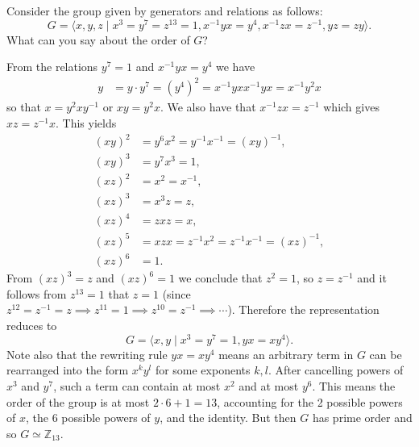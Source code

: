 \documentclass{article}
\newcounter{Problem}
\newenvironment{Problem}{\begin{Exercise}[name={Problem},
                                          counter={Problem}]}
                        {\end{Exercise}}
\begin{document}
\pagebreak

\begin{Problem}
Consider the group given by generators and relations as follows:
$$
G = \langle
      x, y, z
    \mid
      x^3 = y^7 = z^{13} = 1,
      x^{-1} y x = y^4,
      x^{-1} z x = z^{-1},
      yz = zy
    \rangle.
$$
What can you say about the order of $G$?
\end{Problem}

\begin{Answer}
From the relations $y^7 = 1$ and $x^{-1} y x = y^4$ we have
\begin{align*}
   y
&= y \cdot y^7
 = (y^4)^2
 = x^{-1} y x x^{-1} y x
 = x^{-1} y^2 x
\end{align*}
so that $x = y^2 x y^{-1}$ or $xy = y^2 x$.
We also have that $x^{-1}zx = z^{-1}$ which gives
$xz = z^{-1}x$. This yields
\begin{align*}
(xy)^2 &= y^6 x^2 = y^{-1} x^{-1} = (xy)^{-1}, \\
(xy)^3 &= y^7 x^3 = 1, \\
(xz)^2 &= x^2 = x^{-1}, \\
(xz)^3 &= x^3z = z, \\
(xz)^4 &= zxz = x, \\
(xz)^5 &= xzx = z^{-1} x^2 = z^{-1} x^{-1} = (xz)^{-1}, \\
(xz)^6 &= 1.
\end{align*}
From $(xz)^3 = z$ and $(xz)^6 = 1$ we conclude that $z^2 = 1$, so
$z = z^{-1}$ and it follows from $z^{13} = 1$ that $z = 1$
(since
$z^{12} = z^{-1} = z \implies z^{11} = 1 \implies z^{10} = z^{-1}
\implies \cdots$).
Therefore the representation reduces to
$$
G = \langle x, y \mid x^3 = y^7 = 1, yx = xy^4 \rangle.
$$
Note also that the rewriting rule $yx = xy^4$ means an arbitrary term
in $G$ can be rearranged into the form $x^k y^l$ for some exponents
$k, l$. After cancelling powers of
$x^3$ and $y^7$, such a term can contain at most $x^2$ and at most
$y^6$. This means the order of the group is at most $2 \cdot 6 + 1 = 13$,
accounting for the 2 possible powers of $x$, the 6 possible powers of
$y$, and the identity. But then $G$ has prime order and so
$G \simeq \mathbb{Z}_{13}$.
\end{Answer}

\pagebreak
\end{document}
